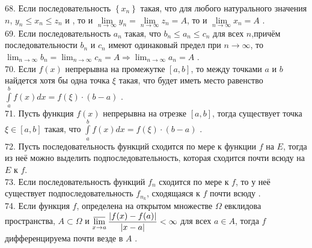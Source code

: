 \documentclass[12pt]{article}
\begin{document}
{{68. Если последовательность ${\displaystyle \left\{ x_{n} \right\}}$ такая, что для любого натурального значения ${\displaystyle n}$, ${\displaystyle y_{n} \leq x_{n} \leq z_{n}}$ и , то и ${\displaystyle \lim \limits _{n \to \infty} y_n=\lim \limits _{n \to \infty} z_n=A}$, то и ${\lim \limits _{n \to \infty} x_n=A}$ .\\

69. Если последовательность ${\displaystyle a_{n}}$ такая, что ${\displaystyle b_{n}\leqslant a_{n}\leqslant c_{n}}$ для всех ${\displaystyle n}$,причём последовательности ${\displaystyle b_{n}}$  и  ${\displaystyle c_{n}}$ имеют одинаковый предел при ${\displaystyle n\to \infty }$, то ${\displaystyle \lim _{n\to \infty }b_{n}=\lim _{n\to \infty }c_{n}=A\Rightarrow \lim _{n\to \infty }a_{n}=A }$ .\\

70. Если ${\displaystyle f(x)}$ непрерывна на промежутке ${\displaystyle [a,b]}$, то между точками ${\displaystyle a}$ и ${\displaystyle b}$ найдется хотя бы одна точка  ${\displaystyle \xi}$ такая, что будет иметь место равенство ${\displaystyle \int \limits _{a}^{b} f(x) dx=f(\xi)\cdot (b-a)}$ .\\

71. Пусть функция ${\displaystyle f(x)}$ непрерывна на отрезке ${\displaystyle [a,b]}$, тогда существует точка ${\displaystyle \xi \in [a,b]}$ такая, что ${\displaystyle \int \limits _{a}^{b} f(x) dx=f(\xi)\cdot (b-a)}$ .\\

72. Пусть последовательность функций сходится по мере к функции ${\displaystyle f}$ на ${\displaystyle E}$, тогда из неё можно выделить подпоследовательность, которая сходится почти всюду на ${\displaystyle E}$ к ${\displaystyle f}$.\\

73. Если последовательность функций ${\displaystyle f_n}$ сходится по мере к ${\displaystyle f}$, то у неё существует подпоследовательность ${\displaystyle f_{n_k}}$, сходящаяся к ${\displaystyle f}$ почти всюду .\\

74. Если функция ${\displaystyle f}$, определена на открытом множестве ${\displaystyle \Omega }$ евклидова пространства, ${\displaystyle A\subset \Omega }$ и ${\displaystyle \varlimsup _{x\to a}{\frac {|f(x)-f(a)|}{|x-a|}}<\infty }$ для всех ${\displaystyle a\in A}$, тогда ${\displaystyle f}$ дифференцируема почти везде в ${\displaystyle A}$ .\\

}}
\end{document}
